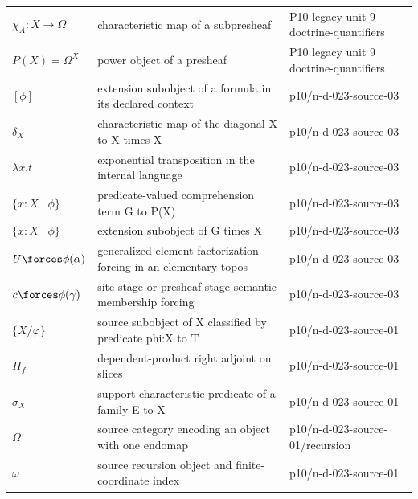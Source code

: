 \begin{longtable}{@{}p{}p{}p{}@{}}
\(\chi_A:X\to\Omega\) & characteristic map of a subpresheaf & P10 legacy unit 9 doctrine-\allowbreak{}quantifiers \\
\(P(X)=\Omega^X\) & power object of a presheaf & P10 legacy unit 9 doctrine-\allowbreak{}quantifiers \\
\([\phi]\) & extension subobject of a formula in its declared context & p10/\allowbreak{}n-\allowbreak{}d-\allowbreak{}023-\allowbreak{}source-\allowbreak{}03 \\
\(\delta_X\) & characteristic map of the diagonal X to X times X & p10/\allowbreak{}n-\allowbreak{}d-\allowbreak{}023-\allowbreak{}source-\allowbreak{}03 \\
\(\lambda x.t\) & exponential transposition in the internal language & p10/\allowbreak{}n-\allowbreak{}d-\allowbreak{}023-\allowbreak{}source-\allowbreak{}03 \\
\(\{x:X\mid\phi\}\) & predicate-valued comprehension term G to P(X) & p10/\allowbreak{}n-\allowbreak{}d-\allowbreak{}023-\allowbreak{}source-\allowbreak{}03 \\
\(\{x:X\mid\phi\}\) & extension subobject of G times X & p10/\allowbreak{}n-\allowbreak{}d-\allowbreak{}023-\allowbreak{}source-\allowbreak{}03 \\
\(U\forces\phi(\alpha)\) & generalized-element factorization forcing in an elementary topos & p10/\allowbreak{}n-\allowbreak{}d-\allowbreak{}023-\allowbreak{}source-\allowbreak{}03 \\
\(c\forces\phi(\gamma)\) & site-stage or presheaf-stage semantic membership forcing & p10/\allowbreak{}n-\allowbreak{}d-\allowbreak{}023-\allowbreak{}source-\allowbreak{}03 \\
\(\{X/\varphi\}\) & source subobject of X classified by predicate phi:X to T & p10/\allowbreak{}n-\allowbreak{}d-\allowbreak{}023-\allowbreak{}source-\allowbreak{}01 \\
\(\Pi_f\) & dependent-product right adjoint on slices & p10/\allowbreak{}n-\allowbreak{}d-\allowbreak{}023-\allowbreak{}source-\allowbreak{}01 \\
\(\sigma_X\) & support characteristic predicate of a family E to X & p10/\allowbreak{}n-\allowbreak{}d-\allowbreak{}023-\allowbreak{}source-\allowbreak{}01 \\
\(\Omega\) & source category encoding an object with one endomap & p10/\allowbreak{}n-\allowbreak{}d-\allowbreak{}023-\allowbreak{}source-\allowbreak{}01/\allowbreak{}recursion \\
\(\omega\) & source recursion object and finite-coordinate index & p10/\allowbreak{}n-\allowbreak{}d-\allowbreak{}023-\allowbreak{}source-\allowbreak{}01 \\

\end{longtable}
